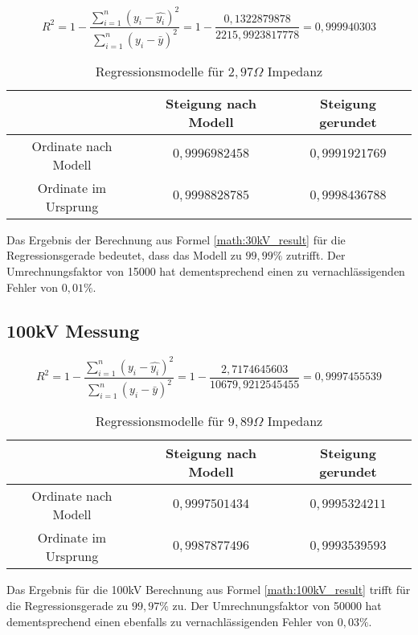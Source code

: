 \begin{equation}
R^{2} = 1 - \frac{\sum \limits_{i=1}^n (y_i - \hat{y_i})^{2}}{\sum \limits_{i=1}^n (y_i - \bar{y})^{2}} = 1 - \frac{0,1322879878}{2215,9923817778} = 0,999940303
\label{math:30kV_result}
\end{equation}

\begin{table}[H]
  \caption{ Regressionsmodelle für $2,97 \Omega$ Impedanz}
  \begingroup
 
\renewcommand{\arraystretch}{1.5} %
   \begin{tabular}{|c|c|c|}
   \hline
      & Steigung nach Modell & Steigung gerundet     \\
      \hline
    Ordinate nach Modell      & $0,9996982458$      & $0,9991921769$ \\
     \hline
    Ordinate im Ursprung      & $0,9998828785$      & $0,9998436788$ \\
 \hline
  \end{tabular}
  \endgroup
\end{table}

Das Ergebnis der Berechnung aus Formel \ref{math:30kV_result} für die Regressionsgerade bedeutet, dass das Modell zu $99,99\%$ zutrifft. Der Umrechnungsfaktor von 15000 hat dementsprechend einen zu vernachlässigenden Fehler von $0,01\%$.

\subsection{100kV Messung}

\begin{equation}
R^{2} = 1 - \frac{\sum \limits_{i=1}^n (y_i - \hat{y_i})^{2}}{\sum \limits_{i=1}^n (y_i - \bar{y})^{2}} = 1 - \frac{2,7174645603}{10679,9212545455} = 0,9997455539
\label{math:100kV_result}
\end{equation}


\begin{table}[H]
  \caption{ Regressionsmodelle für $9,89 \Omega$ Impedanz}
  \begingroup
\renewcommand{\arraystretch}{1.5} %
   \begin{tabular}{|c|c|c|}
   \hline
      & Steigung nach Modell & Steigung gerundet     \\
      \hline
    Ordinate nach Modell      & $0,9997501434$   & $0,9995324211$ \\
     \hline
    Ordinate im Ursprung      & $0,9987877496$     &$0,9993539593$ \\
 \hline
  \end{tabular}
  \endgroup
\end{table}

Das Ergebnis für die 100kV Berechnung aus Formel \ref{math:100kV_result} trifft für die Regressionsgerade zu $99,97\%$ zu. Der Umrechnungsfaktor von 50000 hat dementsprechend einen ebenfalls zu vernachlässigenden Fehler von $0,03\%$.

